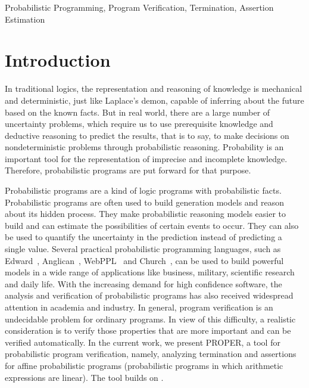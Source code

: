 \documentclass[conference]{IEEEtran}
\begin{document}
\begin{IEEEkeywords}
Probabilistic Programming, Program Verification, Termination, Assertion Estimation 
\end{IEEEkeywords}

\section{Introduction}
In traditional logics, the representation and reasoning of knowledge is mechanical and deterministic, just like Laplace's demon, capable of inferring about the future based on the known facts. But in real world, there are a large number of uncertainty problems, which require us to use prerequisite knowledge and deductive reasoning to predict the results, that is to say, to make decisions on nondeterministic problems through probabilistic reasoning. Probability is an important tool for the representation of imprecise and incomplete knowledge. Therefore, probabilistic programs are put forward for that purpose. 

Probabilistic programs are a kind of logic programs with probabilistic facts. Probabilistic programs are often used to build generation models and reason about its hidden process. They make probabilistic reasoning models easier to build and can estimate the possibilities of certain events to occur. They can also be used to quantify the uncertainty in the prediction instead of predicting a single value. Several practical probabilistic programming languages, such as Edward~\cite{tran2016edward}, Anglican~\cite{Dav2016Design}, WebPPL~\cite{Noah2014language} and Church~\cite{Noah2012language}, can be used to build powerful models in a wide range of applications like business, military, scientific research and daily life. 
With the increasing demand for high confidence software, the analysis and verification of probabilistic programs has also received widespread attention in academia and industry. 
In general, program verification is an undecidable problem for ordinary programs.
In view of this difficulty, a realistic consideration is to verify those properties that are more important and can be verified automatically. In the current work, we present PROPER, a tool for probabilistic program verification, namely, analyzing termination and assertions for affine probabilistic programs (probabilistic programs in which arithmetic expressions are linear). The tool builds on \cite{kris2016termination,cha2015algorithmic,Sankaranarayanan2013Static}. 
\end{document}
